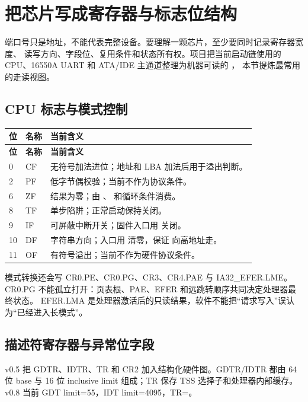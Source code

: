 \section{把芯片写成寄存器与标志位结构}

端口号只是地址，不能代表完整设备。要理解一颗芯片，至少要同时记录寄存器宽度、
读写方向、字段位、复用条件和状态所有权。项目把当前启动链使用的 CPU、16550A
UART 和 ATA/IDE 主通道整理为机器可读的 ，
本节提炼最常用的走读视图。

\subsection{CPU 标志与模式控制}

\begin{longtable}{L{0.12\textwidth}L{0.16\textwidth}L{0.56\textwidth}}
\toprule
\textbf{位} & \textbf{名称} & \textbf{当前含义}\\
\midrule
\endfirsthead
\toprule
\textbf{位} & \textbf{名称} & \textbf{当前含义}\\
\midrule
{} & CF & 无符号加法进位；地址和 LBA 加法后用于溢出判断。\\
2 & PF & 低字节偶校验；当前不作为协议条件。\\
6 & ZF & 结果为零；由 、 和循环条件消费。\\
8 & TF & 单步陷阱；正常启动保持关闭。\\
9 & IF & 可屏蔽中断开关；固件入口用  关闭。\\
10 & DF & 字符串方向；入口用  清零，保证  向高地址走。\\
11 & OF & 有符号溢出；当前不作为硬件协议条件。\\
\bottomrule
\end{longtable}

模式转换还会写 CR0.PE、CR0.PG、CR3、CR4.PAE 与 IA32\_EFER.LME。CR0.PG
不能孤立打开：页表根、PAE、EFER 和远跳转顺序共同决定处理器最终状态。
EFER.LMA 是处理器激活后的只读结果，软件不能把“请求写入”误认为“已经进入长模式”。

\subsection{描述符寄存器与异常位字段}

v0.5 把 GDTR、IDTR、TR 和 CR2 加入结构化硬件图。GDTR/IDTR 都由 64 位
base 与 16 位 inclusive limit 组成；TR 保存 TSS 选择子和处理器内部缓存。
v0.8 当前 GDT limit=55，IDT limit=4095，TR=。

